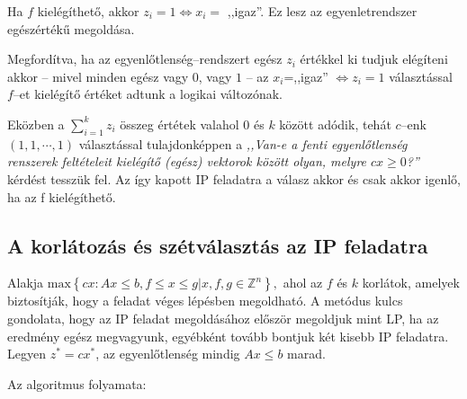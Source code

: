 Ha $f$ kielégíthető, akkor $z_i=1 \Leftrightarrow x_i=$ ,,igaz''. Ez lesz az
egyenletrendszer egészértékű megoldása. 

Megfordítva, ha az egyenlőtlenség--rendszert egész $z_i$ értékkel ki tudjuk
elégíteni akkor -- mivel minden egész vagy $0$, vagy $1$ -- az $x_i$=,,igaz''
$\Leftrightarrow z_i=1$ választással $f$--et kielégítő értéket adtunk a logikai
változónak.

Eközben a $\sum_{i=1}^{k}{z_i}$ összeg értétek valahol $0$ és $k$ között adódik,
tehát $c$--enk $(1,1,\cdots,1)$ választással tulajdonképpen a \emph{,,Van-e a fenti
egyenlőtlenség renszerek feltételeit kielégítő (egész) vektorok között olyan,
melyre $cx \geq 0$?''} kérdést tesszük fel. Az így kapott IP feladatra a válasz
akkor és csak akkor igenlő, ha az f kielégíthető.

\subsection{A korlátozás és szétválasztás az IP feladatra}

Alakja $\mbox{max} \left\{cx:Ax \leq b, f \leq x \leq g| x,f,g \in \mathbb{Z}^n
\right\},$ ahol az $f$ és $k$ korlátok, amelyek biztosítják, hogy a feladat véges
lépésben megoldható. A metódus kulcs gondolata, hogy az IP feladat megoldásához először
megoldjuk mint LP, ha az eredmény egész megvagyunk, egyébként tovább bontjuk két kisebb
IP feladatra. Legyen $z^*=cx^*$, az egyenlőtlenség mindig $Ax \leq b$ marad.

Az algoritmus folyamata:

